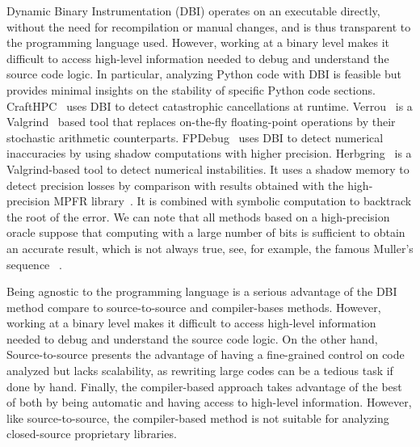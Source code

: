 \documentclass[11pt]{article}
\begin{document}
Dynamic Binary Instrumentation (DBI) operates on an executable directly, without the need for recompilation or manual changes, and is thus
transparent to the programming language used. However, working at a binary level makes it difficult to access high-level information needed
to debug and understand the source code logic. In particular, analyzing Python code with DBI is feasible but provides minimal insights on the stability of specific Python code sections.
CraftHPC~\cite{lam2013dynamic} uses DBI to detect catastrophic cancellations at runtime.
Verrou~\cite{fevotte2016verrou} is a Valgrind~\cite{nethercote2007valgrind} based tool that replaces on-the-fly
floating-point operations by their stochastic arithmetic counterparts. FPDebug~\cite{benz2012dynamic} uses DBI to detect numerical inaccuracies by using shadow computations with higher precision.
Herbgring~\cite{sanchez2017finding} is a Valgrind-based tool to detect
numerical instabilities. It uses a shadow memory to detect precision losses by comparison with results obtained with the high-precision 
MPFR library~\cite{fousse2007mpfr}. It is combined with symbolic computation to backtrack the root of the error.
We can note that all methods based on a high-precision oracle suppose that computing with a large number of bits is sufficient to obtain an accurate result, which is not always true, see, for example, the famous Muller's sequence ~\cite{chatelain2018veritracer}.

Being agnostic to the programming language is a serious advantage of the DBI method compare to source-to-source and compiler-bases methods. However, working at a binary level makes it difficult to access high-level information needed to debug and understand the source code logic. On the other hand, Source-to-source presents the advantage of having a fine-grained control on code analyzed but lacks scalability, as rewriting large codes can be a tedious task if done by hand. Finally, the compiler-based approach takes advantage of the best of both by being automatic and having access to high-level information. However, like source-to-source, the compiler-based method is not suitable for analyzing closed-source proprietary libraries.
\end{document}

